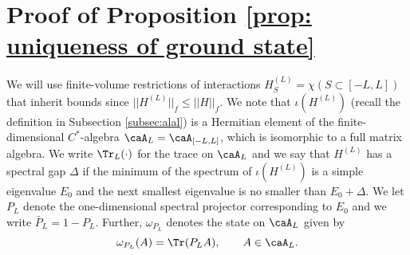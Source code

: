 








\section{Proof of Proposition \ref{prop: uniqueness of ground state}}   \label{sec: app stability}

We will use finite-volume restrictions of interactions $
H^{(L)}_S= \chi(S\subset [-L,L])$ that inherit bounds since
$
||H^{(L)} ||_f \leq   ||H||_f
$. 
We note that $\iota(H^{(L)})$ (recall the definition in Subsection \ref{subsec:alal}) is a Hermitian element of the finite-dimensional $C^*$-algebra $\caA_L=\caA_{[-L,L]}$,  which is isomorphic to a full matrix algebra. We write $\Tr_L(\cdot)$ for the trace on $\caA_L$ and we say that $H^{(L)}$ has a spectral gap $\Delta$ if the minimum of the spectrum of $\iota(H^{(L)})$ is a simple eigenvalue $E_0$ and the next smallest eigenvalue is no smaller than $E_0+\Delta$. We let $P_L$ denote the one-dimensional spectral projector corresponding to $E_0$ and we write $\bar P_L=1-P_L$. 
Further, $\omega_{P_L}$ denotes the state on $\caA_L$ given by 
$$ \omega_{P_L}(A) = \Tr (P_L A), \qquad A \in  \caA_L.
$$
%


